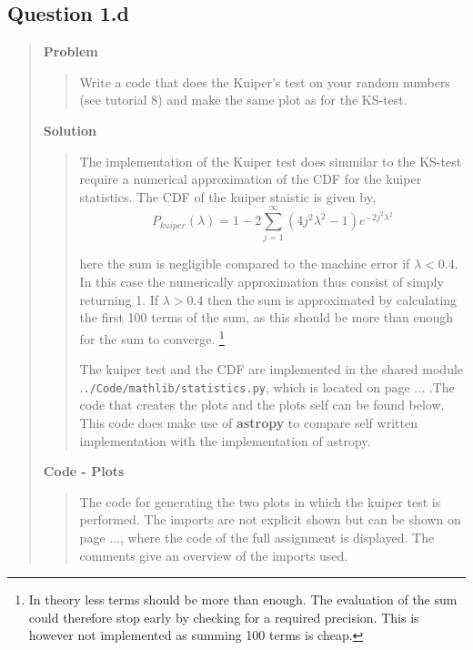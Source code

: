 
\subsection*{\textbf{Question 1.d}}
\begin{quote}

\textbf{Problem}
\begin{quote}
Write a code that does the Kuiper’s test on your random numbers (see tutorial
8) and make the same plot as for the KS-test.
\end{quote}

\textbf{Solution} 
\begin{quote}
The implementation of the Kuiper test does simmilar to the KS-test require a numerical approximation of the CDF for the kuiper statistics. The CDF of the kuiper staistic is given by, 
\begin{equation}
P_{kuiper}( \lambda) =  1 - 2  \sum_{j=1}^{\infty} (4j^2 \lambda^2-1) e^{-2j^2 \lambda^2 }
\end{equation}

here the sum is negligible compared to the machine error if $\lambda < 0.4$. In this case the numerically approximation thus consist of simply returning 1.  If $\lambda > 0.4$ then the sum is approximated by calculating the first 100 terms of the sum, as this should be more than enough for the sum to converge. \footnote{In theory less terms should be more than enough. The evaluation of the sum could therefore stop early by checking for a required precision. This is however not implemented as summing 100 terms is cheap. } 

The kuiper test and the CDF are implemented in the shared module .\texttt{./Code/mathlib/statistics.py}, which is located on page ... .The code that creates the plots and the plots self can be found below.  This code does make use of \textbf{astropy} to compare self written implementation with the implementation of astropy. 
\end{quote}

\textbf{Code - Plots}

\begin{quote}
The code for generating the two plots in which the kuiper test is performed. The imports are not explicit shown but can be shown on page ..., where the code of the full assignment is displayed. The comments give an overview of the imports used. 

\end{quote}


\end{quote}
